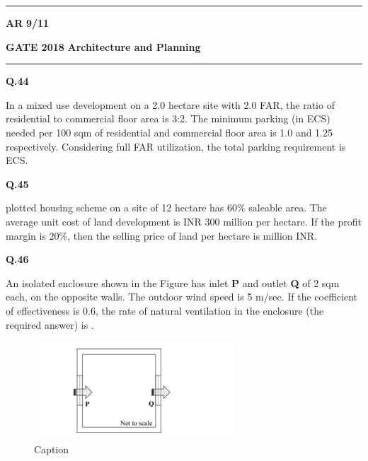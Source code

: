\documentclass{article}
\begin{document}
\vspace{0.5cm}
 \noindent
\hrule \vspace{0.0875CM} \textbf{AR} \hfill  \textbf{9/11}

\newpage

\noindent
\textbf{GATE 2018} \hfill \textbf{Architecture and Planning}
\vspace{0.0012cm} \hrule

\vspace{1.2cm}
\noindent 
\textbf{Q.44} \hspace{0.35cm} \parbox[t]{14.5cm}{In a mixed use development on a 2.0 hectare site with 2.0 FAR, the ratio of residential to commercial floor area is 3:2. The minimum parking (in ECS) needed per 100 sqm of residential and commercial floor area is 1.0 and 1.25 respectively. Considering full FAR utilization, the total parking requirement is \underline{\hspace{3cm}} ECS.}

\vspace{1cm}

\noindent
\textbf{Q.45} \hspace{0.35cm}\parbox[t]{14.5cm}{ plotted housing scheme on a site of 12 hectare has 60\% saleable area. The average unit cost of land development is INR 300 million per hectare. If the profit margin is 20\%, then the selling price of land per hectare is \underline{\hspace{3cm}} million INR.}

\vspace{1cm}

\noindent
\textbf{Q.46}\hspace{0.35cm} \parbox[t]{14.5cm}{ An isolated enclosure shown in the Figure has inlet \textbf{P} and outlet \textbf{Q} of 2 sqm each, on the opposite walls. The outdoor wind speed is 5 m/sec. If the coefficient of effectiveness is 0.6, the rate of natural ventilation in the enclosure (the required answer) is \underline{\hspace{3cm}}.}
\begin{figure} [h]
    \centering
    \includegraphics[width=0.3\linewidth]{Figs/Screenshot 2025-08-16 142607.png}
    \caption{Caption}
    \label{fig:placeholder}
\end{figure}
\end{document}
